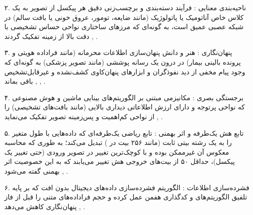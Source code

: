 

۲. ناحیه‌بندی معنایی : فرآیند دسته‌بندی و برچسب‌زنی دقیق هر پیکسل از تصویر به یک کلاس خاص آناتومیک یا پاتولوژیک (مانند ضایعه، تومور، عروق خونی یا بافت سالم) در شبکه عصبی عمیق است، به گونه‌ای که مرزهای ساختاری نواحی حساس تشخیصی با دقت بالا از زمینه تفکیک گردند , .\par



۳. پنهان‌نگاری : هنر و دانش پنهان‌سازی اطلاعات محرمانه (مانند فراداده هویتی و پرونده بالینی بیمار) در درون یک رسانه پوششی (مانند تصویر پزشکی) به گونه‌ای که وجود پیام مخفی از دید نفوذگران و ابزارهای پنهان‌کاوی  کشف‌نشده و غیرقابل‌تشخیص باقی بماند , , .\par



۴. برجستگی بصری : مکانیزمی مبتنی بر الگوریتم‌های بینایی ماشین و هوش مصنوعی که نواحی پرتوجه و دارای ارزش اطلاعاتی دیداری بالایی (مانند بافت‌های تشخیصی) را از نواحی کم‌اهمیت و پس‌زمینه تصویر تفکیک می‌نماید , .\par



۵. تابع هش یک‌طرفه  و اثر بهمنی : تابع ریاضی یک‌طرفه‌ای که داده‌هایی با طول متغیر را به یک رشته بیتی ثابت (مانند ۲۵۶ بیت در ) تبدیل می‌کند؛ به طوری که محاسبه معکوس آن غیرممکن بوده و با کوچک‌ترین تغییر در تصویر ورودی (حتی تغییر یک پیکسل)، حداقل ۵۰ از بیت‌های خروجی هش تغییر می‌یابند که به این خصوصیت اثر بهمنی گفته می‌شود , .\par



۶. فشرده‌سازی اطلاعات : الگوریتم فشرده‌سازی داده‌های دیجیتال بدون افت  که بر پایه تلفیق الگوریتم‌های  و کدگذاری هفمن عمل کرده و حجم فراداده‌های متنی را قبل از فاز پنهان‌نگاری کاهش می‌دهد , .\par

